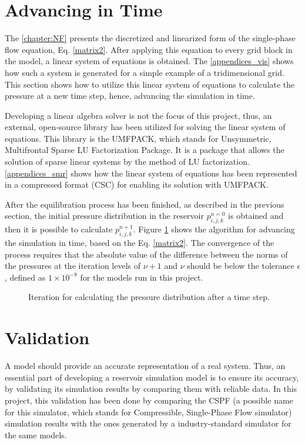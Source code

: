 \section{Advancing in Time}

The \autoref{chapter:NF} presents the discretized and linearized form of the single-phase flow equation, Eq. \ref{matrix2}. After applying this equation to every grid block in the model, a linear system of equations is obtained. The \autoref{appendices_vis} shows how such a system is generated for a simple example of a tridimensional grid. This section shows how to utilize this linear system of equations to calculate the pressure at a new time step, hence, advancing the simulation in time.

Developing a linear algebra solver is not the focus of this project, thus, an external, open-source library has been utilized for solving the linear system of equations. This library is the UMFPACK, which stands for Unsymmetric, Multifrontal Sparse LU Factorization Package. It is a package that allows the solution of sparse linear systems by the method of LU factorization. \autoref{appendices_smr} shows how the linear system of equations has been represented in a compressed format (CSC) for enabling its solution with UMFPACK.

After the equilibration process has been finished, as described in the previous section, the initial pressure distribution in the reservoir $p_{i,j,k}^{n = 0}$ is obtained and then it is possible to calculate $p_{i,j,k}^{n + 1}$. Figure \ref{cha:solution-fig:advance_time_iteration} shows the algorithm for advancing the simulation in time, based on the Eq. \ref{matrix2}. The convergence of the process requires that the absolute value of the difference between the norms of the pressures at the iteration levels of $\nu+1$ and $\nu$ should be below the tolerance $\epsilon$, defined as $1 \times 10^{-8}$ for the models run in this project.
\begin{figure}[H]
	\centering
	\scalebox{.9}{}
	\caption{Iteration for calculating the pressure distribution after a time step.}
	\label{cha:solution-fig:advance_time_iteration}
\end{figure}

\section{Validation}
A model should provide an accurate representation of a real system. Thus, an essential part of developing a reservoir simulation model is to ensure its accuracy, by validating its simulation results by comparing them with reliable data. In this project, this validation has been done by comparing the CSPF (a possible name for this simulator, which stands for Compressible, Single-Phase Flow simulator) simulation results with the ones generated by a industry-standard simulator for the same models. 

